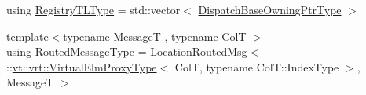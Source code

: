 \begin{DoxyCompactItemize}
\item 
using \hyperlink{namespacevt_1_1vrt_1_1collection_aecdad7ed4df3be1bab2a6bb9c5945964}{Registry\+T\+L\+Type} = std\+::vector$<$ \hyperlink{namespacevt_1_1vrt_1_1collection_a124f83d203352b6bccc4f12ca489b68b}{Dispatch\+Base\+Owning\+Ptr\+Type} $>$
\item 
{\footnotesize template$<$typename MessageT , typename ColT $>$ }\\using \hyperlink{namespacevt_1_1vrt_1_1collection_a1bbc628be0955797f2d45227ee526346}{Routed\+Message\+Type} = \hyperlink{namespacevt_a0cb65f2151629893480ef391def4e733}{Location\+Routed\+Msg}$<$ \+::\hyperlink{namespacevt_1_1vrt_a620a5c8c59d13e513f690c74b4af516f}{vt\+::vrt\+::\+Virtual\+Elm\+Proxy\+Type}$<$ ColT, typename Col\+T\+::\+Index\+Type $>$, MessageT $>$
\end{DoxyCompactItemize}
